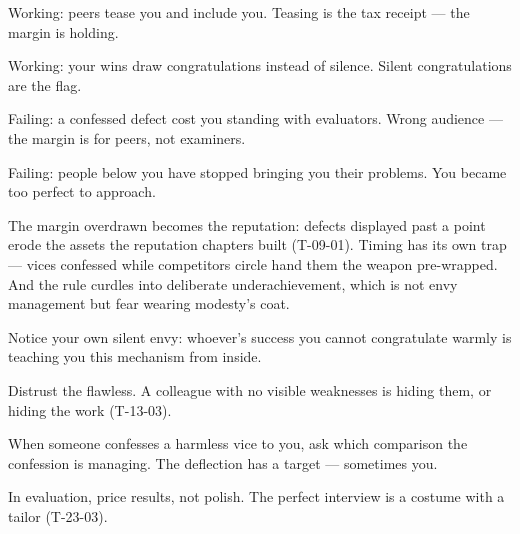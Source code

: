 \begin{feedback}
  \item Working: peers tease you and include you. Teasing is the tax receipt --- the margin is holding.
  \item Working: your wins draw congratulations instead of silence. Silent congratulations are the flag.
  \item Failing: a confessed defect cost you standing with evaluators. Wrong audience --- the margin is for peers, not examiners.
  \item Failing: people below you have stopped bringing you their problems. You became too perfect to approach.
\end{feedback}
\begin{failure}
The margin overdrawn becomes the reputation: defects displayed past a point erode the assets the reputation chapters built (T-09-01). Timing has its own trap --- vices confessed while competitors circle hand them the weapon pre-wrapped. And the rule curdles into deliberate underachievement, which is not envy management but fear wearing modesty's coat.
\end{failure}
\begin{countermeasures}
  \item Notice your own silent envy: whoever's success you cannot congratulate warmly is teaching you this mechanism from inside.
  \item Distrust the flawless. A colleague with no visible weaknesses is hiding them, or hiding the work (T-13-03).
  \item When someone confesses a harmless vice to you, ask which comparison the confession is managing. The deflection has a target --- sometimes you.
  \item In evaluation, price results, not polish. The perfect interview is a costume with a tailor (T-23-03).
\end{countermeasures}

\seesources
{}
